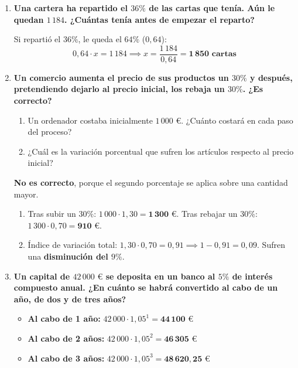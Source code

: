 \documentclass[a4paper,12pt]{article}
\begin{document}
\begin{enumerate}
    \item \textbf{Una cartera ha repartido el $36\%$ de las cartas que tenía. Aún le quedan $1\,184$. ¿Cuántas tenía antes de empezar el reparto?}
        \begin{solucion}
            Si repartió el $36\%$, le queda el $64\%$ ($0,64$):
            $$0,64 \cdot x = 1\,184 \implies x = \dfrac{1\,184}{0,64} = \mathbf{1\,850\text{ cartas}}$$
        \end{solucion}

    \item \textbf{Un comercio aumenta el precio de sus productos un $30\%$ y después, pretendiendo dejarlo al precio inicial, los rebaja un $30\%$. ¿Es correcto?}
        \begin{enumerate}[label=\alph*)]
            \item Un ordenador costaba inicialmente $1\,000\text{ €}$. ¿Cuánto costará en cada paso del proceso?
            \item ¿Cuál es la variación porcentual que sufren los artículos respecto al precio inicial?
        \end{enumerate}
        \begin{solucion}
            \textbf{No es correcto}, porque el segundo porcentaje se aplica sobre una cantidad mayor.
            \begin{enumerate}[label=\alph*)]
                \item Tras subir un $30\%$: $1\,000 \cdot 1,30 = \mathbf{1\,300\text{ €}}$. Tras rebajar un $30\%$: $1\,300 \cdot 0,70 = \mathbf{910\text{ €}}$.
                \item Índice de variación total: $1,30 \cdot 0,70 = 0,91 \implies 1 - 0,91 = 0,09$. Sufren una \textbf{disminución del $9\%$}.
            \end{enumerate}
        \end{solucion}

    \item \textbf{Un capital de $42\,000\text{ €}$ se deposita en un banco al $5\%$ de interés compuesto anual. ¿En cuánto se habrá convertido al cabo de un año, de dos y de tres años?}
        \begin{solucion}
            
            \begin{itemize}
                \item \textbf{Al cabo de 1 año:} $42\,000 \cdot 1,05^{1} = \mathbf{44\,100\text{ €}}$
                \item \textbf{Al cabo de 2 años:} $42\,000 \cdot 1,05^{2} = \mathbf{46\,305\text{ €}}$
                \item \textbf{Al cabo de 3 años:} $42\,000 \cdot 1,05^{3} = \mathbf{48\,620,25\text{ €}}$
            \end{itemize}
        \end{solucion}

\end{enumerate}
\end{document}
